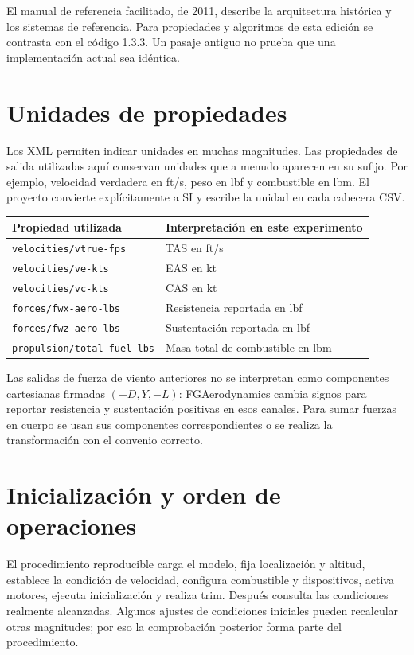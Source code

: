 El manual de referencia facilitado, de 2011, describe la arquitectura histórica y los sistemas de referencia. Para propiedades y algoritmos de esta edición se contrasta con el código 1.3.3. Un pasaje antiguo no prueba que una implementación actual sea idéntica.

\section{Unidades de propiedades}
Los XML permiten indicar unidades en muchas magnitudes. Las propiedades de salida utilizadas aquí conservan unidades que a menudo aparecen en su sufijo. Por ejemplo, velocidad verdadera en ft/s, peso en lbf y combustible en lbm. El proyecto convierte explícitamente a SI y escribe la unidad en cada cabecera CSV.

\begin{center}\begin{tabular}{ll}\toprule
Propiedad utilizada & Interpretación en este experimento\\\midrule
\texttt{velocities/vtrue-fps} & TAS en ft/s\\
\texttt{velocities/ve-kts} & EAS en kt\\
\texttt{velocities/vc-kts} & CAS en kt\\
\texttt{forces/fwx-aero-lbs} & Resistencia reportada en lbf\\
\texttt{forces/fwz-aero-lbs} & Sustentación reportada en lbf\\
\texttt{propulsion/total-fuel-lbs} & Masa total de combustible en lbm\\\bottomrule
\end{tabular}\end{center}
Las salidas de fuerza de viento anteriores no se interpretan como componentes cartesianas firmadas $(-D,Y,-L)$: FGAerodynamics cambia signos para reportar resistencia y sustentación positivas en esos canales. Para sumar fuerzas en cuerpo se usan sus componentes correspondientes o se realiza la transformación con el convenio correcto.

\section{Inicialización y orden de operaciones}
El procedimiento reproducible carga el modelo, fija localización y altitud, establece la condición de velocidad, configura combustible y dispositivos, activa motores, ejecuta inicialización y realiza trim. Después consulta las condiciones realmente alcanzadas. Algunos ajustes de condiciones iniciales pueden recalcular otras magnitudes; por eso la comprobación posterior forma parte del procedimiento.

